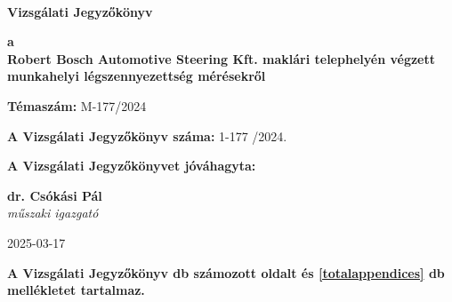 \documentclass[a4paper,12pt]{article}
\begin{document}
	
	
	\thispagestyle{firstpage}
	
	\begin{flushleft}
		{\footnotesize  
			\textbf{
				 \\
				\vspace{-2mm} 
			}
		}
	\end{flushleft}
	
	\vfill
	
	\begin{center}
		{\Huge \textbf{Vizsgálati Jegyzőkönyv}}
	\end{center}
	
	\vfill
	
	\begin{center}
		\large
		\textbf{a} \\
		\textbf{Robert Bosch Automotive Steering Kft. maklári telephelyén
végzett munkahelyi légszennyezettség mérésekről}
	\end{center}
	
	\vfill
	
	\begin{center}
		\textbf{Témaszám:} M-177/2024
	\end{center}    
	
	\vfill
	
	\begin{center}
		\textbf{A Vizsgálati Jegyzőkönyv száma:} 1-177 /2024.
	\end{center}
	
	\begin{center}
		\textbf{A Vizsgálati Jegyzőkönyvet jóváhagyta:}
	\end{center}    
	
	\vfill
	
	\begin{center}
		\textbf{dr. Csókási Pál}\\
		\textit{műszaki igazgató} \\
	\end{center}    
	
	\vfill
	
	\begin{center}
		2025-03-17
	\end{center}    
	
	\vfill
	
	\begin{center}
		\textbf{A Vizsgálati Jegyzőkönyv \pageref{LastPage} db számozott oldalt és \ref{totalappendices} db mellékletet tartalmaz.}
	\end{center}    
	
\end{document}

